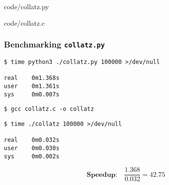\documentclass[rgb,dvipsnames,aspectratio=169,xcolor=table]{beamer}
\begin{document}
\begin{frame}
  \begin{minipage}[t]{0.45\linewidth}

{code/collatz.py}
  \end{minipage}
\hfill
  \begin{minipage}[t]{0.49\linewidth}
  
{code/collatz.c}
  \end{minipage}

\end{frame}

\begin{frame}[fragile]
  \frametitle{Benchmarking \texttt{collatz.py}}

\begin{verbatim}
$ time python3 ./collatz.py 100000 >/dev/null

real    0m1.368s
user    0m1.361s
sys     0m0.007s
\end{verbatim}

\pause

\begin{verbatim}
$ gcc collatz.c -o collatz
\end{verbatim}

\pause

\begin{verbatim}
$ time ./collatz 100000 >/dev/null

real    0m0.032s
user    0m0.030s
sys     0m0.002s
\end{verbatim}

\pause

\[
  \textbf{Speedup:} \quad \frac{1.368}{0.032} = 42.75
\]

\end{frame}
\end{document}
